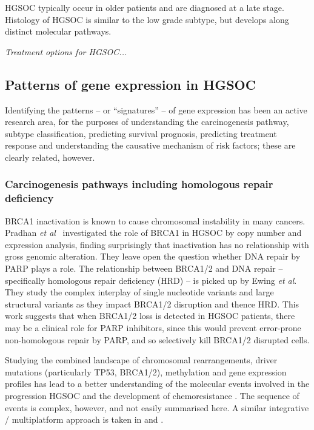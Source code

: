 \documentclass[draft, tikz, 12pt,a4paper,oneside,fleqn]{article}
\newcommand{\etal}{{\em et al\/}}
\begin{document}
HGSOC typically occur in older patients and are diagnosed at a late stage.   Histology of HGSOC is similar to the low grade subtype, but develops along distinct molecular pathways. 

\emph{Treatment options for HGSOC...}


\subsection{Patterns of gene expression in HGSOC}

Identifying the patterns -- or ``signatures'' -- of gene expression has been an active research area, for the purposes of understanding the carcinogenesis pathway, subtype classification, predicting survival prognosis, predicting treatment response and understanding the causative mechanism of risk factors; these are clearly related, however.

\subsubsection{Carcinogenesis pathways including homologous repair deficiency
}


BRCA1 inactivation is known to cause chromosomal instability in many cancers.  Pradhan \etal\ \cite{Pradhan2010} investigated the role of BRCA1 in HGSOC by copy number and expression analysis, finding surprisingly that inactivation has no relationship with gross genomic alteration.  They leave open the question whether DNA repair by PARP plays a role.   The relationship between BRCA1/2 and DNA repair -- specifically homologous repair deficiency (HRD) -- is picked up by Ewing \etal \cite{Ewing2020}.  They study the complex interplay of single nucleotide variants and large structural variants as they impact BRCA1/2 disruption and thence HRD.  This work suggests that when BRCA1/2 loss is detected in HGSOC patients, there may be a clinical role for PARP inhibitors, since this would prevent error-prone non-homologous repair by PARP, and so selectively kill BRCA1/2 disrupted cells.

Studying the combined landscape of chromosomal rearrangements, driver mutations (particularly TP53, BRCA1/2), methylation and gene expression profiles has lead to a better understanding of the molecular events involved in the progression HGSOC and the development of chemoresistance \cite{Patch2015}.  The sequence of events is complex, however, and not easily summarised here.   A similar integrative / multiplatform approach is taken in \cite{He2017a} and \cite{Hoadley2014}.
\end{document}
